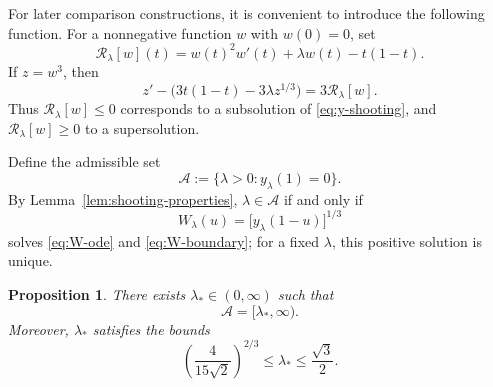 \documentclass[a4paper,fleqn]{cas-sc}
\numberwithin{equation}{section}
\theoremstyle{plain}
\newtheorem{proposition}[theorem]{Proposition}
\theoremstyle{definition}
\begin{document}
For later comparison constructions, it is convenient to introduce the
following function.  For a nonnegative function $w$ with $w(0)=0$, set
\[
 \mathcal R_\lambda[w](t)=w(t)^2w'(t)+\lambda w(t)-t(1-t).
\]
If \(z=w^3\), then
\[
 z'-\bigl(3t(1-t)-3\lambda z^{1/3}\bigr)=3\mathcal R_\lambda[w].
\]
Thus \(\mathcal R_\lambda[w]\le0\) corresponds to a subsolution of
\eqref{eq:y-shooting}, and \(\mathcal R_\lambda[w]\ge0\) to a supersolution.

Define the admissible set
\[
 \mathcal A:=\{\lambda>0:y_\lambda(1)=0\}.
\]
By Lemma~\ref{lem:shooting-properties}, \(\lambda\in\mathcal A\) if and only if
\[
 W_\lambda(u)=\bigl[y_\lambda(1-u)\bigr]^{1/3}
\]
solves \eqref{eq:W-ode} and \eqref{eq:W-boundary}; for a fixed \(\lambda\), this positive
solution is unique.

\begin{proposition}
\label{prop:Cstar-halfline}
There exists \(\lambda_*\in(0,\infty)\) such that
\begin{equation}
 \mathcal A=[\lambda_*,\infty).
 \label{eq:Z-halfline}
\end{equation}
Moreover, \(\lambda_*\) satisfies the bounds
\begin{equation}
 \left(\frac{4}{15\sqrt2}\right)^{2/3}
 \le \lambda_*\le\frac{\sqrt3}{2}.
 \label{eq:rough-Cstar-bounds}
\end{equation}
\end{proposition}
\end{document}
